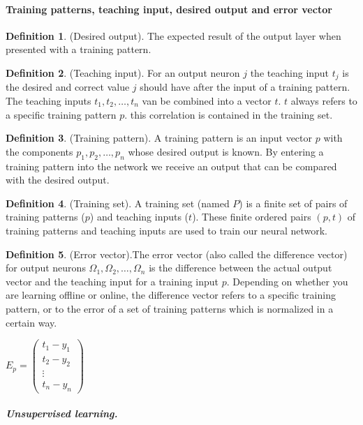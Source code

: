\documentclass[pdftex,a4paper,12pt,twoside]{report}
\theoremstyle{plain} \newtheorem{theorem}{Theorem} \newtheorem{proposition}{Proposition} \newtheorem{lemma}{Lemma} \newtheorem*{corollary}{Corollary}
\theoremstyle{definition} \newtheorem{definition}{Definition} \newtheorem{conjecture}{Conjecture} \newtheorem*{example}{Example} \newtheorem{algorithm}{Algorithm}
\theoremstyle{remark} \newtheorem*{remark}{Remark} \newtheorem*{note}{Note} \newtheorem{case}{Case}
\begin{document}
\paragraph{Training patterns, teaching input, desired output and error vector}
\begin{definition}
(Desired output). The expected result of the output layer when presented with a training pattern.
\end{definition}
\begin{definition}
(Teaching input). For an output neuron $j$ the teaching input $t_j$ is the desired and correct value $j$ should have after the input of a training pattern. The teaching inputs $t_1,t_2, \dotsc ,t_n$ van be combined into a vector $t$. $t$ always refers to a specific training pattern $p$. this correlation is contained in the training set.
\end{definition}
\begin{definition}
(Training pattern). A training pattern is an input vector $p$ with the components $p_1,p_2, \dotsc , p_n$ whose desired output is known. By entering a training pattern into the network we receive an output that can be compared with the desired output. 
\end{definition}
\begin{definition}
(Training set). A training set (named $P$) is a finite set of pairs of training patterns ($p$) and teaching inputs ($t$). These finite ordered pairs $(p,t)$ of training patterns and teaching inputs are used to train our neural network.
\end{definition}
\begin{definition}
(Error vector).The error vector (also called the difference vector) for output neurons $\Omega_1,\Omega_2, \dotsc ,\Omega_n$ is the difference between the actual output vector and the teaching input for a training input $p$. Depending on whether you are learning offline or online, the difference vector refers to a specific training pattern, or to the error of a set of training patterns which is normalized in a certain way.\begin{center}
$E_p = 	\begin{pmatrix}
			t_1-y_1\\
			t_2-y_2\\
			\vdots\\
			t_n-y_n
		\end{pmatrix}$
\end{center}
\end{definition}
\subparagraph{Unsupervised learning.}
\end{document}
